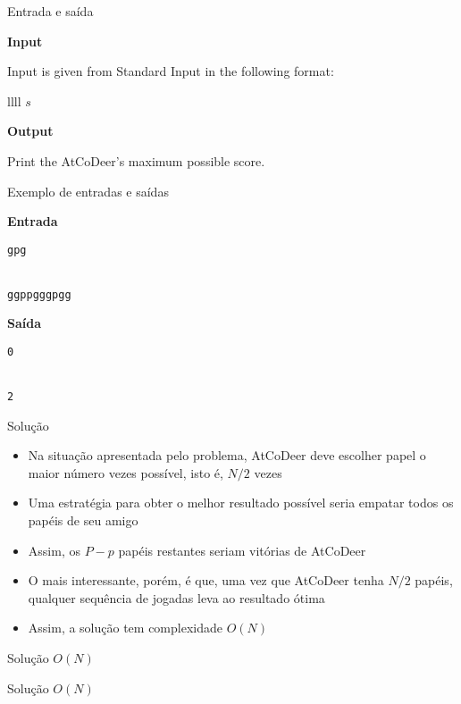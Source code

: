 \begin{frame}[fragile]{Entrada e saída}

\textbf{Input}

Input is given from Standard Input in the following format:
\begin{atcoderio}{llll}
$s$ \\
\end{atcoderio}

\textbf{Output}

Print the AtCoDeer's maximum possible score.

\end{frame}

\begin{frame}[fragile]{Exemplo de entradas e saídas}

\begin{minipage}[t]{0.55\textwidth}
\textbf{Entrada}
\begin{verbatim}
gpg


ggppgggpgg
\end{verbatim}
\end{minipage}
\begin{minipage}[t]{0.4\textwidth}
\textbf{Saída}
\begin{verbatim}
0


2
\end{verbatim}
\end{minipage}
\end{frame}

\begin{frame}[fragile]{Solução}

    \begin{itemize}
        \item Na situação apresentada pelo problema, AtCoDeer deve escolher papel o maior número
            vezes possível, isto é, $N/2$ vezes

        \item Uma estratégia para obter o melhor resultado possível seria empatar todos os papéis
            de seu amigo

        \item Assim, os $P - p$ papéis restantes seriam vitórias de AtCoDeer

        \item O mais interessante, porém, é que, uma vez que AtCoDeer tenha $N/2$ papéis, qualquer
            sequência de jogadas leva ao resultado ótima

        \item Assim, a solução tem complexidade $O(N)$

    \end{itemize}

\end{frame}

\begin{frame}[fragile]{Solução $O(N)$}
\end{frame}

\begin{frame}[fragile]{Solução $O(N)$}
\end{frame}
